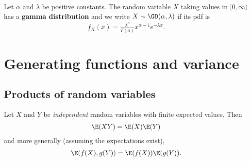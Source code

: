 \documentclass{article}
\begin{document}
\begin{definition}
    Let $\alpha$ and $\lambda$ be positive constants. The random variable
    $X$ taking values in $[0,\infty)$ has a \textbf{gamma distribution} and we 
    write $X\sim\GD(\alpha, \lambda)$ if its pdf is
    \begin{align*}
        f_X(x) = \frac{\lambda^\alpha}{\Gamma(a)}x^{\alpha-1}e^{-\lambda x}.
    \end{align*}
\end{definition}
\section{Generating functions and variance}
\subsection{Products of random variables}
\begin{theorem}
    Let $X$ and $Y$ be \emph{independent} random variables with finite expected values.
    Then
    \begin{align*}
        \E(XY) = \E(X)\E(Y)
    \end{align*}
    and more generally (assuming the expectations exist),
    \begin{align*}
        \E(f(X), g(Y)) = \E(f(X))\E(g(Y)).
    \end{align*}
\end{theorem}
\end{document}
